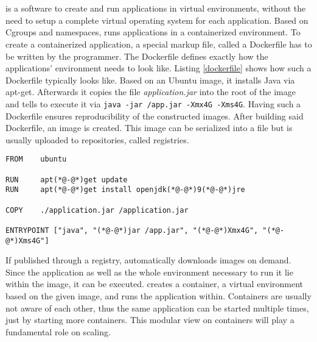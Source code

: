 
\section{\docker{}}
\docker{} is a software to create and run applications in virtual environments, without the need to setup a complete virtual operating system for each application. Based on Cgroups and namespaces, \docker{} runs applications in a containerized environment.
To create a containerized application, a special markup file, called a Dockerfile has to be written by the programmer. The Dockerfile defines exactly how the applications' environment needs to look like. Listing \ref{dockerfile} shows how such a Dockerfile typically looks like. Based on an Ubuntu image, it installs Java via apt-get. Afterwards it copies the file {\em{} application.jar} into the root of the image and tells \docker{} to execute it via \lstinline[]|java -jar /app.jar -Xmx4G -Xms4G|. Having such a Dockerfile ensures reproducibility of the constructed images. After building said Dockerfile, an image is created. This image can be serialized into a file but is usually uploaded to \docker{} repositories, called registries. 

\begin{minipage}{\textwidth}
	
\begin{lstlisting}[style=YAML,caption=A sample Dockerfile used for creating a simple Ubuntu based image to start a Java application.,label=dockerfile]
FROM	ubuntu

RUN		apt(*@-@*)get update
RUN		apt(*@-@*)get install openjdk(*@-@*)9(*@-@*)jre

COPY	./application.jar /application.jar

ENTRYPOINT ["java", "(*@-@*)jar /app.jar", "(*@-@*)Xmx4G", "(*@-@*)Xms4G"]
\end{lstlisting}

\end{minipage}

If published through a registry, \docker{} automatically downloads images on demand. Since the application as well as the whole environment necessary to run it lie within the image, it can be executed. \docker{} creates a container, a virtual environment based on the given image, and runs the application within. Containers are usually not aware of each other, thus the same application can be started multiple times, just by starting more containers. This modular view on containers will play a fundamental role on scaling.